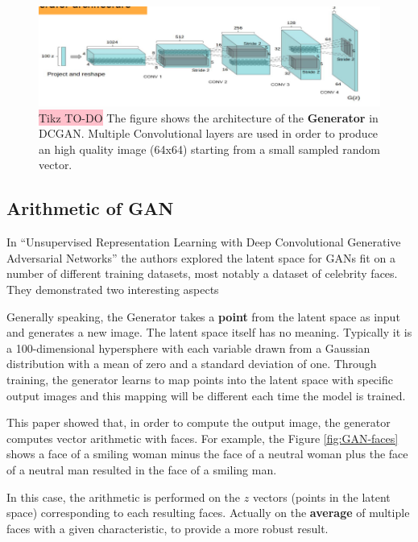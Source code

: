 \begin{figure}[!htbp]
    \centering
    \includegraphics[width=\linewidth]{tikz/DCGAN.png}
    \caption{{\color{red}\colorbox{pink}{Tikz TO-DO}} The figure shows the architecture of the \textbf{Generator} in DCGAN. Multiple Convolutional layers are used in order to produce an high quality image (64x64) starting from a small sampled random vector.}
    \label{fig:DCGAN}
\end{figure}


\subsection{Arithmetic of GAN}

In “Unsupervised Representation Learning with Deep Convolutional Generative Adversarial Networks” the authors explored the latent space for GANs fit on a number of different training datasets, most notably a dataset of celebrity faces. They demonstrated two interesting aspects


Generally speaking, the Generator takes a \textbf{point} from the latent space as input and generates a new image. The latent space itself has no meaning. Typically it is a 100-dimensional hypersphere with each variable drawn from a Gaussian distribution with a mean of zero and a standard deviation of one. Through training, the generator learns to map points into the latent space with specific output images and this mapping will be different each time the model is trained.

This paper showed that, in order to compute the output image, the generator computes vector arithmetic with faces. For example, the Figure \ref{fig:GAN-faces} shows a face of a smiling woman minus the face of a neutral woman plus the face of a neutral man resulted in the face of a smiling man.

In this case, the arithmetic is performed on the $z$ vectors (points in the latent space) corresponding to each resulting faces. Actually on the \textbf{average} of multiple faces with a given characteristic, to provide a more robust result.

